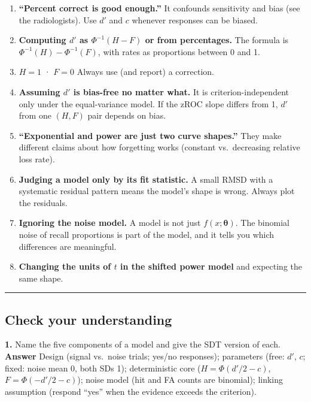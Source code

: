 \begin{enumerate}
\def\labelenumi{\arabic{enumi}.}
\tightlist
\item
  \textbf{``Percent correct is good enough.''} It confounds sensitivity
  and bias (see the radiologists). Use \(d'\) and \(c\) whenever
  responses can be biased.
\item
  \textbf{Computing \(d'\) as \(\Phi^{-1}(H - F)\) or from percentages.}
  The formula is \(\Phi^{-1}(H) - \Phi^{-1}(F)\), with rates as
  proportions between 0 and 1.
\item
  \(H = 1\) · \(F = 0\) Always use (and report) a correction.
\item
  \textbf{Assuming \(d'\) is bias-free no matter what.} It is
  criterion-independent only under the equal-variance model. If the zROC
  slope differs from 1, \(d'\) from one \((H, F)\) pair depends on bias.
\item
  \textbf{``Exponential and power are just two curve shapes.''} They
  make different claims about how forgetting works (constant
  vs.~decreasing relative loss rate).
\item
  \textbf{Judging a model only by its fit statistic.} A small RMSD with
  a systematic residual pattern means the model's shape is wrong. Always
  plot the residuals.
\item
  \textbf{Ignoring the noise model.} A model is not just
  \(f(x;\boldsymbol\theta)\). The binomial noise of recall proportions
  is part of the model, and it tells you which differences are
  meaningful.
\item
  \textbf{Changing the units of \(t\) in the shifted power model} and
  expecting the same shape.
\end{enumerate}

\begin{center}\rule{0.5\linewidth}{0.5pt}\end{center}

\subsection{Check your understanding}

\textbf{1.} Name the five components of a model and give the SDT version
of each. \textbf{Answer} Design (signal vs.~noise trials; yes/no
responses); parameters (free: \(d'\), \(c\); fixed: noise mean 0, both
SDs 1); deterministic core (\(H = \Phi(d'/2 - c)\),
\(F = \Phi(-d'/2 - c)\)); noise model (hit and FA counts are binomial);
linking assumption (respond ``yes'' when the evidence exceeds the
criterion).

